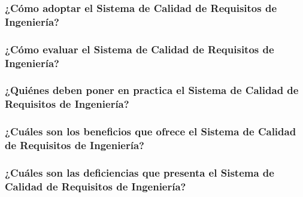 \documentclass[runningheads,a4paper]{llncs}
\begin{document}
\subsubsection{¿Cómo adoptar el Sistema de Calidad de Requisitos de Ingeniería?}

\subsubsection{¿Cómo evaluar el Sistema de Calidad de Requisitos de Ingeniería?}

\subsubsection{¿Quiénes deben poner en practica el Sistema de Calidad de Requisitos de Ingeniería?}

\subsubsection{¿Cuáles son los beneficios que ofrece el Sistema de Calidad de Requisitos de Ingeniería?}

\subsubsection{¿Cuáles son las deficiencias que presenta el Sistema de Calidad de Requisitos de Ingeniería?}



\printnoidxglossaries     
         


\end{document}
